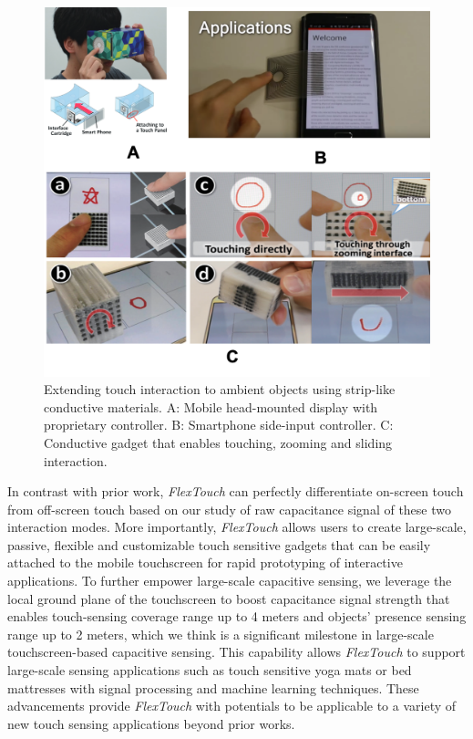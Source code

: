 \begin{figure}[ht]
    \centering
	\includegraphics[width=0.88\columnwidth]{figures/ambient-capcitive-sensing.png}
	\setlength{\belowcaptionskip}{-6pt}
    \caption{Extending touch interaction to ambient objects using strip-like conductive materials. A: Mobile head-mounted display with proprietary controller. B: Smartphone side-input controller. C: Conductive gadget that enables touching, zooming and sliding interaction.}
    \label{fig:ambient-capcitive-sensing}
\end{figure}

In contrast with prior work, \textit{FlexTouch} can perfectly differentiate on-screen touch from off-screen touch based on our study of raw capacitance signal of these two interaction modes. More importantly, \textit{FlexTouch} allows users to create large-scale, passive, flexible and customizable touch sensitive gadgets that can be easily attached to the mobile touchscreen for rapid prototyping of interactive applications. To further empower large-scale capacitive sensing, we leverage the local ground plane of the touchscreen to boost capacitance signal strength that enables touch-sensing coverage range up to 4 meters and objects' presence sensing range up to 2 meters, which we think is a significant milestone in large-scale touchscreen-based capacitive sensing. This capability allows \textit{FlexTouch} to support large-scale sensing applications such as touch sensitive yoga mats or bed mattresses with signal processing and machine learning techniques. These advancements provide \textit{FlexTouch} with potentials to be applicable to a variety of new touch sensing applications beyond prior works.

